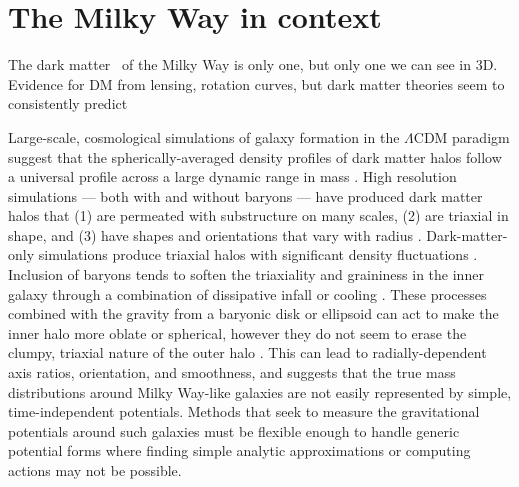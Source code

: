 \section{The Milky Way in context}\label{sec:milkyway-context}

The dark matter \mwhalo\ of the Milky Way is only one, but only one we can see in 3D. Evidence for DM from lensing, rotation curves, but dark matter theories seem to consistently predict

Large-scale, cosmological simulations of galaxy formation in the $\Lambda$CDM paradigm suggest that the spherically-averaged density profiles of dark matter halos follow a universal profile across a large dynamic range in mass \citep{navarro96}. High resolution simulations --- both with and without baryons --- have produced dark matter halos that (1) are permeated with substructure on many scales, (2) are triaxial in shape, and (3) have shapes and orientations that vary with radius \citep{dubinski91, jing02, kuhlen07, veraciro11}. Dark-matter-only simulations produce triaxial halos \citep{jing02} with significant density fluctuations \citep{zemp09}. Inclusion of baryons tends to soften the triaxiality and graininess in the inner galaxy through a combination of dissipative infall \citep{dubinski94} or cooling \citep{bryan13}. These processes combined with the gravity from a baryonic disk or ellipsoid can act to make the inner halo more oblate or spherical, however they do not seem to erase the clumpy, triaxial nature of the outer halo \citep[e.g.,][]{pontzen12}. This can lead to radially-dependent axis ratios, orientation, and smoothness, and suggests that the true mass distributions around Milky Way-like galaxies are not easily represented by simple, time-independent potentials. Methods that seek to measure the gravitational potentials around such galaxies must be flexible enough to handle generic potential forms where finding simple analytic approximations or computing actions may not be possible.

